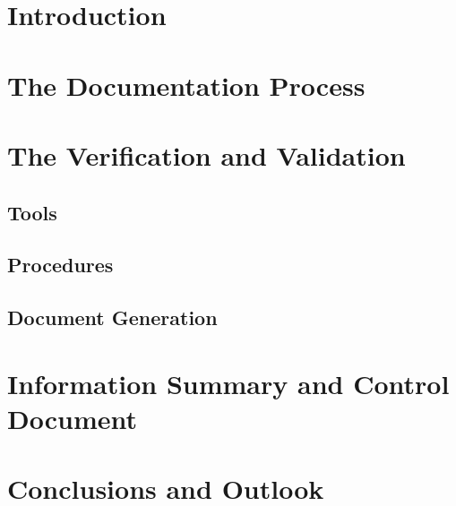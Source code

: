 \section{Introduction}

\section{The Documentation Process}

\section{The Verification and Validation}

\subsection{Tools}

\subsection{Procedures}

\subsection{Document Generation}

\section{Information Summary and Control Document}

\section{Conclusions and Outlook}
